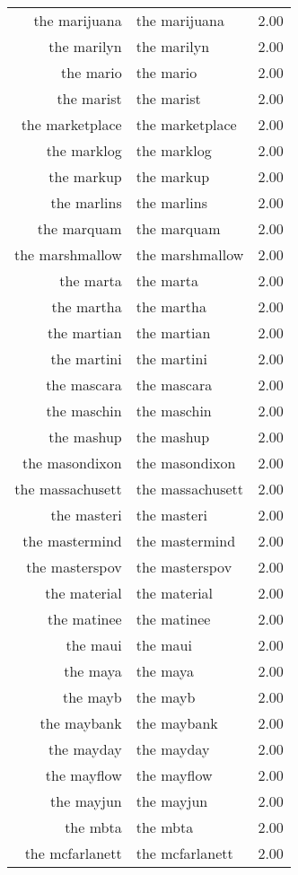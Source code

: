 \begin{table}[ht]
\begin{tabular}{rlr}
  the marijuana & the marijuana & 2.00 \\ 
  the marilyn & the marilyn & 2.00 \\ 
  the mario & the mario & 2.00 \\ 
  the marist & the marist & 2.00 \\ 
  the marketplace & the marketplace & 2.00 \\ 
  the marklog & the marklog & 2.00 \\ 
  the markup & the markup & 2.00 \\ 
  the marlins & the marlins & 2.00 \\ 
  the marquam & the marquam & 2.00 \\ 
  the marshmallow & the marshmallow & 2.00 \\ 
  the marta & the marta & 2.00 \\ 
  the martha & the martha & 2.00 \\ 
  the martian & the martian & 2.00 \\ 
  the martini & the martini & 2.00 \\ 
  the mascara & the mascara & 2.00 \\ 
  the maschin & the maschin & 2.00 \\ 
  the mashup & the mashup & 2.00 \\ 
  the masondixon & the masondixon & 2.00 \\ 
  the massachusett & the massachusett & 2.00 \\ 
  the masteri & the masteri & 2.00 \\ 
  the mastermind & the mastermind & 2.00 \\ 
  the masterspov & the masterspov & 2.00 \\ 
  the material & the material & 2.00 \\ 
  the matinee & the matinee & 2.00 \\ 
  the maui & the maui & 2.00 \\ 
  the maya & the maya & 2.00 \\ 
  the mayb & the mayb & 2.00 \\ 
  the maybank & the maybank & 2.00 \\ 
  the mayday & the mayday & 2.00 \\ 
  the mayflow & the mayflow & 2.00 \\ 
  the mayjun & the mayjun & 2.00 \\ 
  the mbta & the mbta & 2.00 \\ 
  the mcfarlanett & the mcfarlanett & 2.00 \\ 

\end{tabular}
\end{table}
